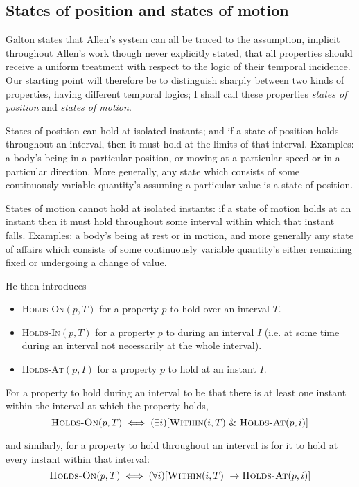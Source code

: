 \subsection{States of position and states of motion}
Galton states that Allen's system can all be traced to the assumption, implicit throughout Allen's
work though never explicitly stated, that all properties should receive a
uniform treatment with respect to the logic of their temporal incidence. Our
starting point will therefore be to distinguish sharply between two kinds of
properties, having different temporal logics; I shall call these properties \textit{states
	of position} and \textit{states of motion}.

States of position can hold at isolated instants; and if a state of position
holds throughout an interval, then it must hold at the limits of that interval.
Examples: a body's being in a particular position, or moving at a particular
speed or in a particular direction. More generally, any state which consists of
some continuously variable quantity's assuming a particular value is a state of
position.

States of motion cannot hold at isolated instants: if a state of motion holds
at an instant then it must hold throughout some interval within which that
instant falls. Examples: a body's being at rest or in motion, and more generally
any state of affairs which consists of some continuously variable quantity's
either remaining fixed or undergoing a change of value.

He then introduces
\begin{itemize}
	\item  \textsc{Holds-On}$(p, T)$ for a property $p$ to hold over an interval $T$.
	\item \textsc{Holds-In}$(p, T)$ for a property $p$ to during an interval $I$ (i.e. at some time during an interval not necessarily at the whole interval).
	\item \textsc{Holds-At}$(p, I)$ for a property $p$ to hold at an instant $I$.
\end{itemize}

For a property to hold during
an interval to be that there is at least one instant within the interval at which
the property holds,
\[
	\textsc{Holds-On}(p, T) \iff (\exists i)[\textsc{Within}(i, T) \  \& \ \textsc{Holds-At}(p, i)]
\]

and similarly, for a property to hold throughout an interval is for it to hold at
every instant within that interval:
\[
	\textsc{Holds-On}(p, T) \iff (\forall i)[\textsc{Within}(i, T) \  \to \textsc{Holds-At}(p, i)]
\]


